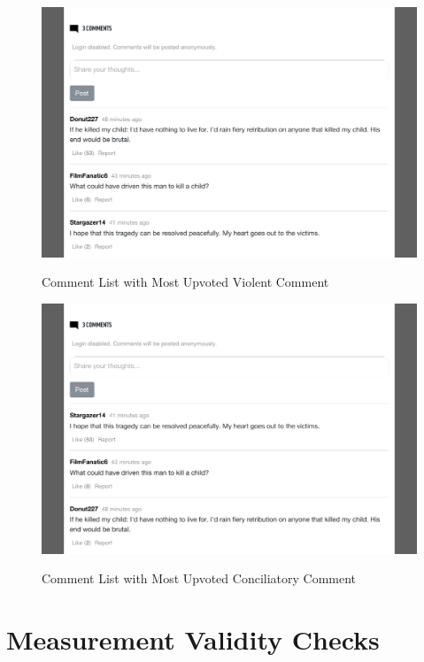\documentclass[]{article}
\begin{document}
\begin{figure}
  \centering
  \caption{Comment List with Most Upvoted Violent Comment}
  \vspace{1em}
  \includegraphics[width=.88\textwidth]{figures/comments.pdf}\\
  \label{com_vio}
\end{figure}

\begin{figure}
  \centering
  \caption{Comment List with Most Upvoted Conciliatory Comment }
  \vspace{1em}
  \includegraphics[width=.88\textwidth]{figures/comments_2.pdf}\\
  \label{com_neu}
\end{figure}

\newpage

\section{Measurement Validity Checks}
\end{document}
